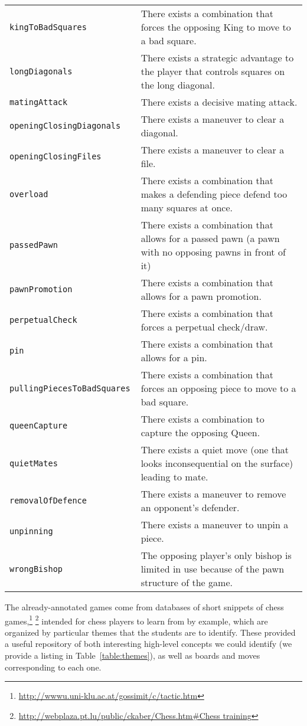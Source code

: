 \documentclass[11pt]{article}
\begin{document}
\begin{table*}
\begin{tabular}{lp{}}
\tt{kingToBadSquares} & There exists a combination that forces the opposing King to move to a bad square. \\
\tt{longDiagonals} & There exists a strategic advantage to the player that controls squares on the long diagonal. \\
\tt{matingAttack} & There exists a decisive mating attack. \\
\tt{openingClosingDiagonals} & There exists a maneuver to clear a diagonal. \\
\tt{openingClosingFiles} & There exists a maneuver to clear a file. \\
\tt{overload} & There exists a combination that makes a defending piece defend too many squares at once. \\
\tt{passedPawn} & There exists a combination that allows for a passed pawn (a pawn with no opposing pawns in front of it) \\
\tt{pawnPromotion} & There exists a combination that allows for a pawn promotion. \\
\tt{perpetualCheck} & There exists a combination that forces a perpetual check/draw. \\
\tt{pin} & There exists a combination that allows for a pin. \\
\tt{pullingPiecesToBadSquares} & There exists a combination that forces an opposing piece to move to a bad square. \\
\tt{queenCapture} & There exists a combination to capture the opposing Queen. \\
\tt{quietMates} & There exists a quiet move (one that looks inconsequential on the surface) leading to mate. \\
\tt{removalOfDefence} & There exists a maneuver to remove an opponent’s defender. \\
\tt{unpinning} & There exists a maneuver to unpin a piece. \\
\tt{wrongBishop} & The opposing player’s only bishop is limited in use because of the pawn structure of the game. \\ \hline
\end{tabular}
\caption{List of high-level themes we attempt to automatically identify, along with explanations}
\label{table:themes}
\end{table*}

The already-annotated games come from databases of short snippets of chess games,\footnote{\url{http://wwwu.uni-klu.ac.at/gossimit/c/tactic.htm}} \footnote{\url{http://webplaza.pt.lu/public/ckaber/Chess.htm#Chess training}} intended for chess players to learn from by example, which are organized by particular themes that the students are to identify. These provided a useful repository of both interesting high-level concepts we could identify (we provide a listing in Table~\ref{table:themes}), as well as boards and moves corresponding to each one.
\end{document}
